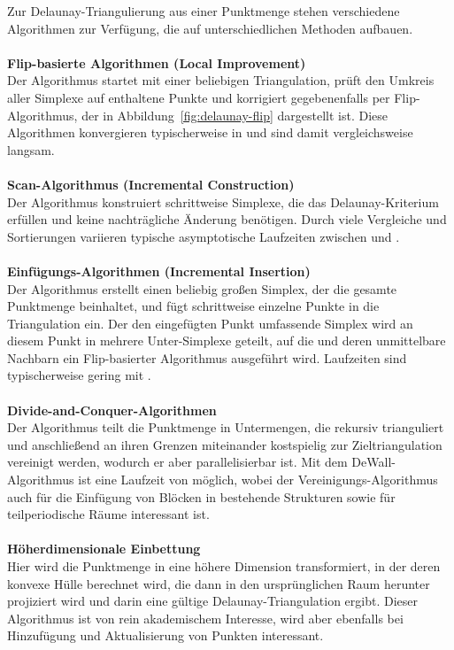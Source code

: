 Zur Delaunay-Triangulierung aus einer Punktmenge stehen verschiedene Algorithmen zur Verfügung, die auf unterschiedlichen Methoden aufbauen.
\\\\
\textbf{Flip-basierte Algorithmen (Local Improvement)}\\
Der Algorithmus startet mit einer beliebigen Triangulation, prüft den Umkreis aller Simplexe auf enthaltene Punkte und korrigiert gegebenenfalls per Flip-Algorithmus, der in Abbildung~\ref{fig:delaunay-flip} dargestellt ist.
Diese Algorithmen konvergieren typischerweise in  und sind damit vergleichsweise langsam.
\\\\
\textbf{Scan-Algorithmus (Incremental Construction)}\\
Der Algorithmus konstruiert schrittweise Simplexe, die das Delaunay-Kriterium erfüllen und keine nachträgliche Änderung benötigen.
Durch viele Vergleiche und Sortierungen variieren typische asymptotische Laufzeiten zwischen  und .
\\\\
\textbf{Einfügungs-Algorithmen (Incremental Insertion)}\\
Der Algorithmus erstellt einen beliebig großen Simplex, der die gesamte Punktmenge beinhaltet, und fügt schrittweise einzelne Punkte in die Triangulation ein.
Der den eingefügten Punkt umfassende Simplex wird an diesem Punkt in mehrere Unter-Simplexe geteilt, auf die und deren unmittelbare Nachbarn ein Flip-basierter Algorithmus ausgeführt wird.
Laufzeiten sind typischerweise gering mit .
\\\\
\textbf{Divide-and-Conquer-Algorithmen}\\
Der Algorithmus teilt die Punktmenge in Untermengen, die rekursiv trianguliert und anschließend an ihren Grenzen miteinander kostspielig zur Zieltriangulation vereinigt werden, wodurch er aber parallelisierbar ist.
Mit dem DeWall-Algorithmus\cite{cignoni_dewall:_1998} ist eine Laufzeit von  möglich, wobei der Vereinigungs-Algorithmus auch für die Einfügung von Blöcken in bestehende Strukturen sowie für teilperiodische Räume interessant ist.
\\\\
\textbf{Höherdimensionale Einbettung}\\
Hier wird die Punktmenge in eine höhere Dimension transformiert, in der deren konvexe Hülle berechnet wird, die dann in den ursprünglichen Raum herunter projiziert wird und darin eine gültige Delaunay-Triangulation ergibt.
Dieser Algorithmus ist von rein akademischem Interesse, wird aber ebenfalls bei Hinzufügung und Aktualisierung von Punkten interessant.

